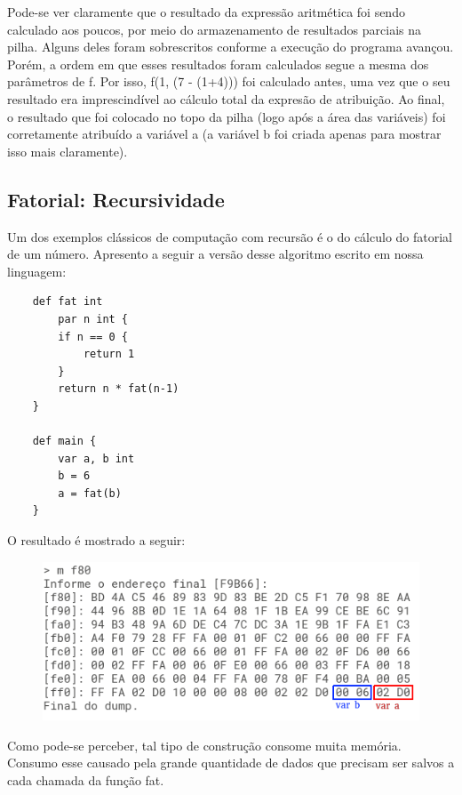 \documentclass[a4paper,12pt]{report}
\begin{document}
    Pode-se ver claramente que o resultado da expressão aritmética foi sendo calculado aos poucos, por meio do armazenamento de resultados parciais na pilha. Alguns deles foram sobrescritos conforme a execução do programa avançou. Porém, a ordem em que esses resultados foram calculados segue a mesma dos parâmetros de f. Por isso, f(1, (7 - (1+4))) foi calculado antes, uma vez que o seu resultado era imprescindível ao cálculo total da expresão de atribuição. Ao final, o resultado que foi colocado no topo da pilha (logo após a área das variáveis) foi corretamente atribuído a variável a (a variável b foi criada apenas para mostrar isso mais claramente).
    
    \subsection*{Fatorial: Recursividade}
    Um dos exemplos clássicos de computação com recursão é o do cálculo do fatorial de um número. Apresento a seguir a versão desse algoritmo escrito em nossa linguagem:

    \begin{lstlisting}
    def fat int
        par n int {
        if n == 0 {
            return 1
        }
        return n * fat(n-1)
    }

    def main {
        var a, b int
        b = 6
        a = fat(b)
    }
    \end{lstlisting}

    O resultado é mostrado a seguir:
    \newpage
    \begin{figure}[h]
        \centering
        \includegraphics[scale=0.65]{fat_recursao}
    \end{figure}

    Como pode-se perceber, tal tipo de construção consome muita memória. Consumo esse causado pela grande quantidade de dados que precisam ser salvos a cada chamada da função fat.
\end{document}

